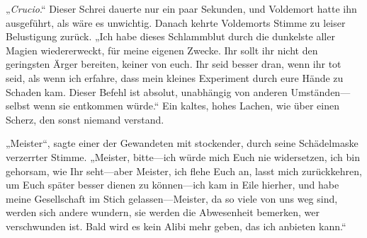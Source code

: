 „\emph{Crucio}.“
Dieser Schrei dauerte nur ein paar Sekunden, und Voldemort hatte ihn ausgeführt, als wäre es unwichtig. Danach kehrte Voldemorts Stimme zu leiser Belustigung zurück.
„Ich habe dieses Schlammblut durch die dunkelste aller Magien wiedererweckt, für meine eigenen Zwecke. Ihr sollt ihr nicht den geringsten Ärger bereiten, keiner von euch. Ihr seid besser dran, wenn ihr tot seid, als wenn ich erfahre, dass mein kleines Experiment durch eure Hände zu Schaden kam. Dieser Befehl ist absolut, unabhängig von anderen Umständen—selbst wenn sie entkommen würde.“
Ein kaltes, hohes Lachen, wie über einen Scherz, den sonst niemand verstand.

„Meister“, sagte einer der Gewandeten mit stockender, durch seine Schädelmaske verzerrter Stimme. „Meister, bitte—ich würde mich Euch nie widersetzen, ich bin gehorsam, wie Ihr seht—aber Meister, ich flehe Euch an, lasst mich zurückkehren, um Euch später besser dienen zu können—ich kam in Eile hierher, und habe meine Gesellschaft im Stich gelassen—Meister, da so viele von uns weg sind, werden sich andere wundern, sie werden die Abwesenheit bemerken, wer verschwunden ist. Bald wird es kein Alibi mehr geben, das ich anbieten kann.“

